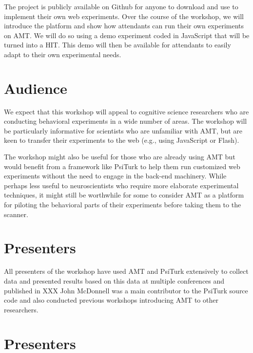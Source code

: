 \documentclass[10pt,letterpaper]{article}
\begin{document}
The project is publicly available on Github for anyone to download and use to
implement their own web experiments.  Over the course of the workshop, we will
introduce the platform and show how attendants can run their own experiments on
{AMT}. We will do so using a demo experiment coded in JavaScript that will be
turned into a {HIT}.  This demo will then be available for attendants to easily
adapt to their own experimental needs.

\section{Audience}
We expect that this workshop will appeal to cognitive science researchers who are
conducting behavioral experiments in a wide number of areas.  The workshop will
be particularly informative for scientists who are unfamiliar with AMT, but are
keen to transfer their experiments to the web (e.g., using JavaScript or Flash).

The workshop might also be useful for those who are already using AMT but would
benefit from a framework like PsiTurk to help them run customized web experiments
without the need to engage in the back-end machinery.  While perhaps less useful
to neuroscientists who require more elaborate experimental techniques, it might
still be worthwhile for some to consider AMT as a platform for piloting the
behavioral parts of their experiments before taking them to the scanner.


\section{Presenters}

All presenters of the workshop have used AMT and PsiTurk extensively to collect
data and presented results based on this data at multiple conferences and
published in XXX   John McDonnell
was a main contributor to the PsiTurk source code and also conducted previous
workshops introducing AMT to other researchers.  

\section{Presenters}




\setlength{\bibleftmargin}{.125in}
\setlength{\bibindent}{-\bibleftmargin}



\todos
\end{document}
